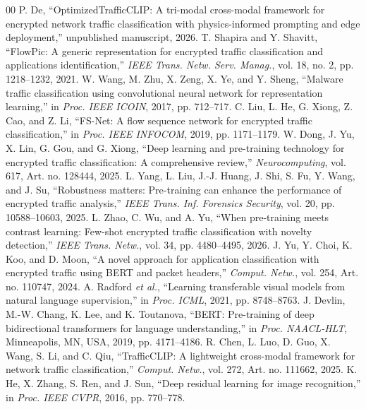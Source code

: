 \documentclass[journal]{IEEEtran}
\begin{document}
\begin{thebibliography}{00}
 P. De, ``OptimizedTrafficCLIP: A tri-modal cross-modal framework for encrypted network traffic classification with physics-informed prompting and edge deployment,'' unpublished manuscript, 2026.
 T. Shapira and Y. Shavitt, ``FlowPic: A generic representation for encrypted traffic classification and applications identification,'' \emph{IEEE Trans. Netw. Serv. Manag.}, vol. 18, no. 2, pp. 1218--1232, 2021.
 W. Wang, M. Zhu, X. Zeng, X. Ye, and Y. Sheng, ``Malware traffic classification using convolutional neural network for representation learning,'' in \emph{Proc. IEEE ICOIN}, 2017, pp. 712--717.
 C. Liu, L. He, G. Xiong, Z. Cao, and Z. Li, ``FS-Net: A flow sequence network for encrypted traffic classification,'' in \emph{Proc. IEEE INFOCOM}, 2019, pp. 1171--1179.
 W. Dong, J. Yu, X. Lin, G. Gou, and G. Xiong, ``Deep learning and pre-training technology for encrypted traffic classification: A comprehensive review,'' \emph{Neurocomputing}, vol. 617, Art. no. 128444, 2025.
 L. Yang, L. Liu, J.-J. Huang, J. Shi, S. Fu, Y. Wang, and J. Su, ``Robustness matters: Pre-training can enhance the performance of encrypted traffic analysis,'' \emph{IEEE Trans. Inf. Forensics Security}, vol. 20, pp. 10588--10603, 2025.
 L. Zhao, C. Wu, and A. Yu, ``When pre-training meets contrast learning: Few-shot encrypted traffic classification with novelty detection,'' \emph{IEEE Trans. Netw.}, vol. 34, pp. 4480--4495, 2026.
 J. Yu, Y. Choi, K. Koo, and D. Moon, ``A novel approach for application classification with encrypted traffic using BERT and packet headers,'' \emph{Comput. Netw.}, vol. 254, Art. no. 110747, 2024.
 A. Radford \emph{et al.}, ``Learning transferable visual models from natural language supervision,'' in \emph{Proc. ICML}, 2021, pp. 8748--8763.
 J. Devlin, M.-W. Chang, K. Lee, and K. Toutanova, ``BERT: Pre-training of deep bidirectional transformers for language understanding,'' in \emph{Proc. NAACL-HLT}, Minneapolis, MN, USA, 2019, pp. 4171--4186.
 R. Chen, L. Luo, D. Guo, X. Wang, S. Li, and C. Qiu, ``TrafficCLIP: A lightweight cross-modal framework for network traffic classification,'' \emph{Comput. Netw.}, vol. 272, Art. no. 111662, 2025.
 K. He, X. Zhang, S. Ren, and J. Sun, ``Deep residual learning for image recognition,'' in \emph{Proc. IEEE CVPR}, 2016, pp. 770--778.

\end{thebibliography}
\end{document}
